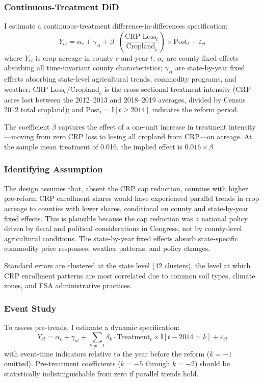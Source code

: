 \documentclass[12pt]{article}
\newcommand{\ind}{\mathbb{I}}
\begin{document}
\subsubsection*{Continuous-Treatment DiD} I estimate a continuous-treatment difference-in-differences specification:
\begin{equation}
Y_{ct} = \alpha_c + \gamma_{st} + \beta \cdot \left(\frac{\text{CRP Loss}_c}{\text{Cropland}_c}\right) \times \text{Post}_t + \varepsilon_{ct}
\label{eq:main}
\end{equation}
where $Y_{ct}$ is crop acreage in county $c$ and year $t$; $\alpha_c$ are county fixed effects absorbing all time-invariant county characteristics; $\gamma_{st}$ are state-by-year fixed effects absorbing state-level agricultural trends, commodity programs, and weather; $\text{CRP Loss}_c / \text{Cropland}_c$ is the cross-sectional treatment intensity (CRP acres lost between the 2012--2013 and 2018--2019 averages, divided by Census 2012 total cropland); and $\text{Post}_t = \ind[t \geq 2014]$ indicates the reform period.

The coefficient $\beta$ captures the effect of a one-unit increase in treatment intensity---moving from zero CRP loss to losing all cropland from CRP---on acreage. At the sample mean treatment of 0.016, the implied effect is $0.016 \times \beta$.

\subsubsection*{Identifying Assumption} The design assumes that, absent the CRP cap reduction, counties with higher pre-reform CRP enrollment shares would have experienced parallel trends in crop acreage to counties with lower shares, conditional on county and state-by-year fixed effects. This is plausible because the cap reduction was a national policy driven by fiscal and political considerations in Congress, not by county-level agricultural conditions. The state-by-year fixed effects absorb state-specific commodity price responses, weather patterns, and policy changes.

Standard errors are clustered at the state level (42 clusters), the level at which CRP enrollment patterns are most correlated due to common soil types, climate zones, and FSA administrative practices.

\subsubsection*{Event Study} To assess pre-trends, I estimate a dynamic specification:
\begin{equation}
Y_{ct} = \alpha_c + \gamma_{st} + \sum_{k \neq -1} \delta_k \cdot \text{Treatment}_c \times \ind[t - 2014 = k] + \varepsilon_{ct}
\end{equation}
with event-time indicators relative to the year before the reform ($k = -1$ omitted). Pre-treatment coefficients ($k = -5$ through $k = -2$) should be statistically indistinguishable from zero if parallel trends hold.
\end{document}
